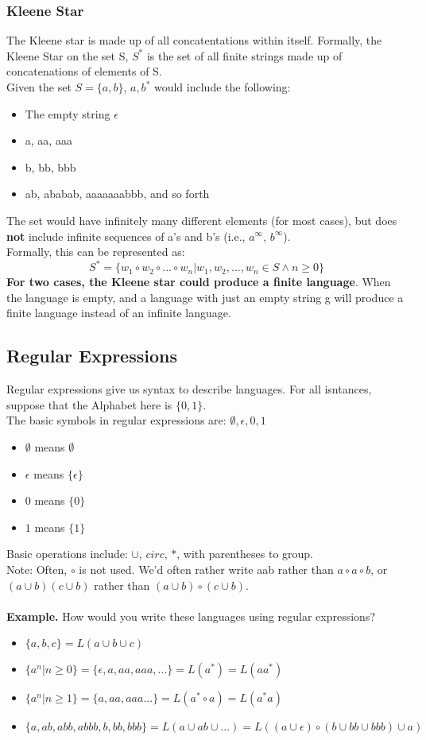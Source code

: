\documentclass[a4paper, 12pt, margin=1.2in]{article}
\begin{document}
\subsubsection{Kleene Star}
The Kleene star is made up of all concatentations within itself. Formally, the Kleene Star on the set S, $S^*$ is the set of all finite strings made up of concatenations of elements of S. \\
Given the set $S=\{a, b\}$, ${a, b}^*$ would include the following:
\begin{itemize}
    \item The empty string $\epsilon$
    \item a, aa, aaa
    \item b, bb, bbb
    \item ab, ababab, aaaaaaabbb, and so forth
\end{itemize}
The set would have infinitely many different elements (for most cases), but does \textbf{not} include infinite sequences of a's and b's (i.e., $a^\infty$, $b^\infty$).\\
Formally, this can be represented as:
\[
    S^* = \{w_1 \circ w_2 \circ ... \circ w_n | w_1, w_2, ..., w_n \in S \land n \geq 0 \}
\]
\textbf{For two cases, the Kleene star could produce a finite language}. When the language is empty, and a language with just an empty string g will produce a finite language instead of an infinite language. 
\subsection{Regular Expressions}
Regular expressions give us syntax to describe languages. For all isntances, suppose that the Alphabet here is $\{0, 1\}$. \\
The basic symbols in regular expressions are: $\emptyset, \epsilon, 0, 1$
\begin{itemize}
    \item $\emptyset$ means $\emptyset$
    \item $\epsilon$ means $\{\epsilon\}$
    \item $0$ means $\{0\}$
    \item $1$ means $\{1\}$
\end{itemize}
Basic operations include: $\cup$, $circ$, $*$, with parentheses to group.\\
Note: Often, $\circ$ is not used. We'd often rather write aab rather than $a \circ a \circ b$, or $(a \cup b) (c \cup b)$ rather than $(a \cup b) \circ (c \cup b)$. \\ \\
\textbf{Example.} How would you write these languages using regular expressions? 
\begin{itemize}
    \item $\{a, b, c\} = L(a \cup b \cup c)$
    \item $\{a^n | n \geq 0\} = \{\epsilon, a, aa, aaa, ...\} = L(a^*) = L(aa^*)$
    \item $\{a^n | n \geq 1\} = \{a, aa, aaa...\} = L(a^* \circ a) = L(a^*a)$
    \item $\{a, ab, abb, abbb, b, bb, bbb\} = L(a \cup ab \cup ...) = L((a \cup \epsilon) \circ (b \cup bb \cup bbb) \cup a)$
\end{itemize}
\end{document}
